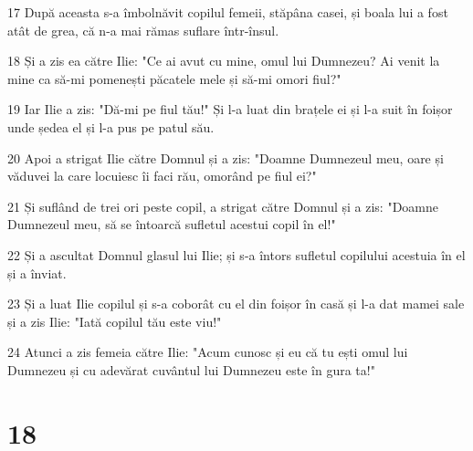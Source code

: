 \par 17 După aceasta s-a îmbolnăvit copilul femeii, stăpâna casei, și boala lui a fost atât de grea, că n-a mai rămas suflare într-însul.
\par 18 Și a zis ea către Ilie: "Ce ai avut cu mine, omul lui Dumnezeu? Ai venit la mine ca să-mi pomenești păcatele mele și să-mi omori fiul?"
\par 19 Iar Ilie a zis: "Dă-mi pe fiul tău!" Și l-a luat din brațele ei și l-a suit în foișor unde ședea el și l-a pus pe patul său.
\par 20 Apoi a strigat Ilie către Domnul și a zis: "Doamne Dumnezeul meu, oare și văduvei la care locuiesc îi faci rău, omorând pe fiul ei?"
\par 21 Și suflând de trei ori peste copil, a strigat către Domnul și a zis: "Doamne Dumnezeul meu, să se întoarcă sufletul acestui copil în el!"
\par 22 Și a ascultat Domnul glasul lui Ilie; și s-a întors sufletul copilului acestuia în el și a înviat.
\par 23 Și a luat Ilie copilul și s-a coborât cu el din foișor în casă și l-a dat mamei sale și a zis Ilie: "Iată copilul tău este viu!"
\par 24 Atunci a zis femeia către Ilie: "Acum cunosc și eu că tu ești omul lui Dumnezeu și cu adevărat cuvântul lui Dumnezeu este în gura ta!"

\chapter{18}

